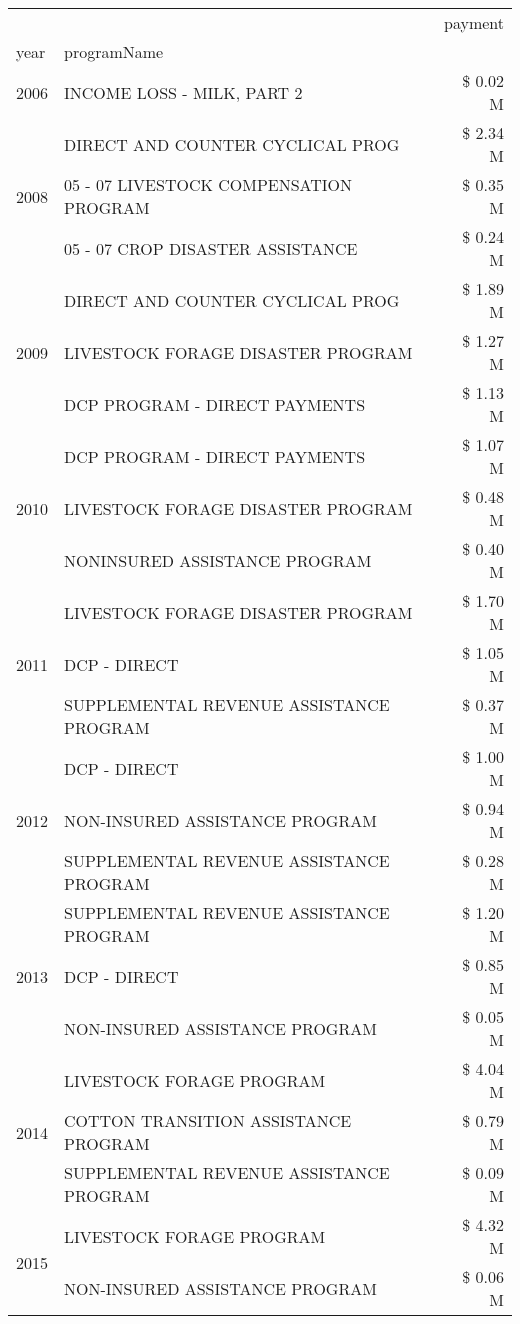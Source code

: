 \begin{tabular}{llr}
\toprule
 &  & payment \\
year & programName &  \\
\midrule
2006 & INCOME LOSS - MILK, PART 2 & \$ 0.02 M \\
\cline{1-3}
\multirow[t]{3}{*}{2008} & DIRECT AND COUNTER CYCLICAL PROG & \$ 2.34 M \\
 & 05 - 07 LIVESTOCK COMPENSATION PROGRAM & \$ 0.35 M \\
 & 05 - 07 CROP DISASTER ASSISTANCE & \$ 0.24 M \\
\cline{1-3}
\multirow[t]{3}{*}{2009} & DIRECT AND COUNTER CYCLICAL PROG & \$ 1.89 M \\
 & LIVESTOCK FORAGE DISASTER  PROGRAM & \$ 1.27 M \\
 & DCP PROGRAM - DIRECT PAYMENTS & \$ 1.13 M \\
\cline{1-3}
\multirow[t]{3}{*}{2010} & DCP PROGRAM - DIRECT PAYMENTS & \$ 1.07 M \\
 & LIVESTOCK FORAGE DISASTER  PROGRAM & \$ 0.48 M \\
 & NONINSURED ASSISTANCE PROGRAM & \$ 0.40 M \\
\cline{1-3}
\multirow[t]{3}{*}{2011} & LIVESTOCK FORAGE DISASTER PROGRAM & \$ 1.70 M \\
 & DCP - DIRECT & \$ 1.05 M \\
 & SUPPLEMENTAL REVENUE ASSISTANCE PROGRAM & \$ 0.37 M \\
\cline{1-3}
\multirow[t]{3}{*}{2012} & DCP - DIRECT & \$ 1.00 M \\
 & NON-INSURED ASSISTANCE PROGRAM & \$ 0.94 M \\
 & SUPPLEMENTAL REVENUE ASSISTANCE PROGRAM & \$ 0.28 M \\
\cline{1-3}
\multirow[t]{3}{*}{2013} & SUPPLEMENTAL REVENUE ASSISTANCE PROGRAM & \$ 1.20 M \\
 & DCP - DIRECT & \$ 0.85 M \\
 & NON-INSURED ASSISTANCE PROGRAM & \$ 0.05 M \\
\cline{1-3}
\multirow[t]{3}{*}{2014} & LIVESTOCK FORAGE PROGRAM & \$ 4.04 M \\
 & COTTON TRANSITION ASSISTANCE PROGRAM & \$ 0.79 M \\
 & SUPPLEMENTAL REVENUE ASSISTANCE PROGRAM & \$ 0.09 M \\
\cline{1-3}
\multirow[t]{3}{*}{2015} & LIVESTOCK FORAGE PROGRAM & \$ 4.32 M \\
 & NON-INSURED ASSISTANCE PROGRAM & \$ 0.06 M \\

\end{tabular}
